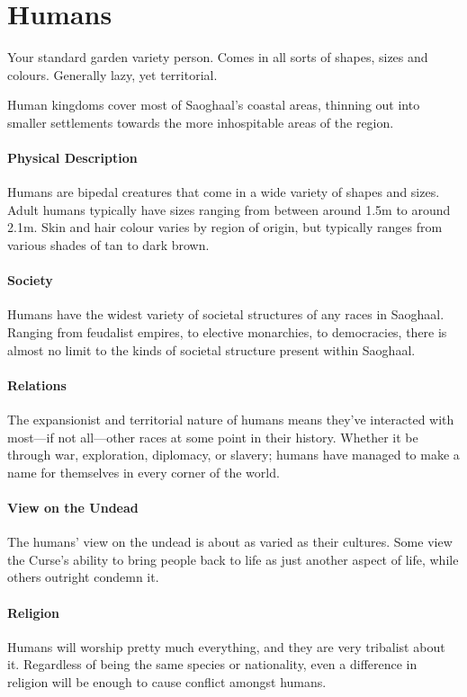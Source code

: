 \section{Humans}\label{sec:human}
Your standard garden variety person.
Comes in all sorts of shapes, sizes and colours.
Generally lazy, yet territorial.

Human kingdoms cover most of Saoghaal's coastal areas, thinning out into smaller settlements towards the more inhospitable areas of the region.

\paragraph{Physical Description}
Humans are bipedal creatures that come in a wide variety of shapes and sizes.
Adult humans typically have sizes ranging from between around 1.5m to around 2.1m.
Skin and hair colour varies by region of origin, but typically ranges from various shades of tan to dark brown.

\paragraph{Society}
Humans have the widest variety of societal structures of any races in Saoghaal.
Ranging from feudalist empires, to elective monarchies, to democracies, there is almost no limit to the kinds of societal structure present within Saoghaal.

\paragraph{Relations}
The expansionist and territorial nature of humans means they've interacted with most---if not all---other races at some point in their history.
Whether it be through war, exploration, diplomacy, or slavery; humans have managed to make a name for themselves in every corner of the world.

\paragraph{View on the Undead}
The humans' view on the undead is about as varied as their cultures.
Some view the Curse's ability to bring people back to life as just another aspect of life, while others outright condemn it.

\paragraph{Religion}
Humans will worship pretty much everything, and they are very tribalist about it.
Regardless of being the same species or nationality, even a difference in religion will be enough to cause conflict amongst humans.

